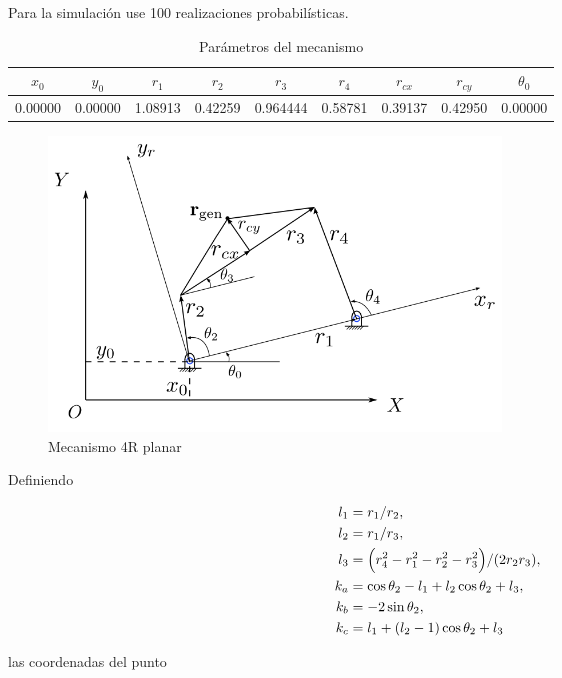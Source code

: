 \documentclass[a4paper, 12pt]{article}
\begin{document}
    Para la simulación use 100 realizaciones probabilísticas.

    \begin{table}[h!]
        \centering
        \begin{tabular}{ c c c c c c c c c }
            \hline
            $x_0$ & $y_0$ & $r_1$ & $r_2$ & $r_3$ & $r_4$ & $r_{cx}$ & $r_{cy}$ & $\theta_0$ \\
            \hline
            0.00000 & 0.00000 & 1.08913 & 0.42259 & 0.964444 & 0.58781 & 0.39137 & 0.42950 & 0.00000 \\
            \hline
        \end{tabular}
        \caption{Parámetros del mecanismo}
        \label{Tabla:1}
    \end{table}

    \begin{figure}[h]
        \centering
        \includegraphics[width=12cm]{img/mecanismo.png}
        \caption{Mecanismo 4R planar}
        \label{Figura:1}
    \end{figure}

    Definiendo

    \begin{align*}
        l_1 &= r_1 / r_2, \\
        l_2 &= r_1 / r_3, \\
        l_3 &= \qty( r_4^2 - r_1^2 - r_2^2 - r_3^2 ) / \qty(2r_2 r_3), \\
        k_a &= \cos \theta_2 - l_1 + l_2 \cos \theta_2 + l_3, \\
        k_b &= -2 \sin \theta_2, \\
        k_c &= l_1 + \qty(l_2 - 1) \cos \theta_2 + l_3
    \end{align*}

    las coordenadas del punto
\end{document}
